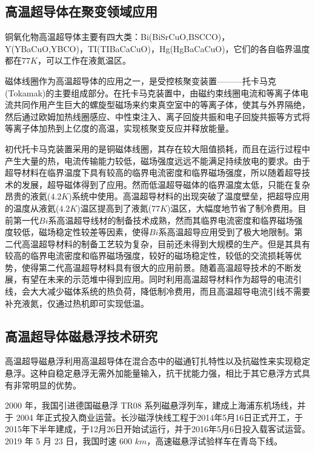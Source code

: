 \documentclass[UTF8, twocolumn]{ctexart}
\begin{document}
    \subsection{高温超导体在聚变领域应用}

    铜氧化物高温超导体主要有四大类：Bi(BiSrCuO,BSCCO)，Y(YBaCuO,YBCO)，TI(TIBaCaCuO)，Hg(HgBaCaCuO)，它们的各自临界温度都在$77K$，可以工作在液氮温区。\cite{孙林煜2012第二代高温超导体研究与在聚变领域应用前景}

    磁体线圈作为高温超导体的应用之一，是受控核聚变装置———托卡马克(Tokamak)的主要组成部分。在托卡马克装置中，由磁约束线圈电流和等离子体电流共同作用产生巨大的螺旋型磁场来约束真空室中的等离子体，使其与外界隔绝，然后通过欧姆加热线圈感应、中性束注入、离子回旋共振和电子回旋共振等方式将等离子体加热到上亿度的高温，实现核聚变反应并释放能量。

    初代托卡马克装置采用的是铜磁体线圈，其存在较大阻值损耗，而且在运行过程中产生大量的热，电流传输能力较低，磁场强度远远不能满足持续放电的要求。由于超导材料在临界温度下具有较高的临界电流密度和临界磁场强度，所以随着超导技术的发展，超导磁体得到了应用。然而低温超导磁体的临界温度太低，只能在复杂昂贵的液氦($4.2K$)系统中使用。高温超导材料的出现突破了温度壁垒，把超导应用的温度从液氦($4.2K$)温区提高到了液氮($77K$)温区，大幅度地节省了制冷费用。目前第一代$Bi$系高温超导线材的制备技术成熟，然而其临界电流密度和临界磁场强度较低，磁场稳定性较差等因素，使得$Bi$系高温超导应用受到了极大地限制。第二代高温超导材料的制备工艺较为复杂，目前还未得到大规模的生产。但是其具有较高的临界电流密度和临界磁场强度，较好的磁场稳定性，较低的交流损耗等优势，使得第二代高温超导材料具有很大的应用前景。随着高温超导技术的不断发展，有望在未来的示范堆中得到应用。同时利用高温超导材料作为超导的电流引线，会大大减少磁体系统的热负荷，降低制冷费用，而且高温超导电流引线不需要补充液氮，仅通过热机即可实现低温\cite{孙林煜2012第二代高温超导体研究与在聚变领域应用前景}。

    \subsection{高温超导体磁悬浮技术研究}
    高温超导磁悬浮利用高温超导体在混合态中的磁通钉扎特性以及抗磁性来实现稳定悬浮。这种自稳定悬浮无需外加能量输入，抗干扰能力强，相比于其它悬浮方式具有非常明显的优势。\cite{刘文旭2020高温超导磁悬浮技术研究论述}

    2000 年，我国引进德国磁悬浮 TR08 系列磁悬浮列车，建成上海浦东机场线，并于 2004 年正式投入商业运营\cite{1643050}。长沙磁浮快线工程于2014年5月16日正式开工，于2015年下半年建成，于12月26日开始试运行，并于2016年5月6日投入载客试运营。2019 年 5 月 23 日，我国时速 600 $km$，高速磁悬浮试验样车在青岛下线。
\end{document}
